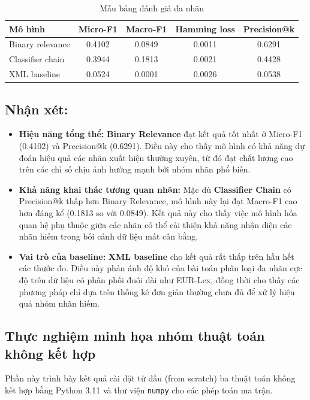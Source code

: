 \begin{table}[H]
\centering
\caption{Mẫu bảng đánh giá đa nhãn}
\begin{tabular}{lcccc}
\toprule
\textbf{Mô hình} & \textbf{Micro-F1} & \textbf{Macro-F1} & \textbf{Hamming loss} & \textbf{Precision@k} \\
\midrule
Binary relevance &  0.4102  & 0.0849  & 0.0011 & 0.6291 \\
Classifier chain & 0.3944 &  0.1813 & 0.0021 & 0.4428 \\
XML baseline & 0.0524 & 0.0001 & 0.0026 & 0.0538 \\
\bottomrule
\end{tabular}
\end{table}

\subsection*{Nhận xét:}
\begin{itemize}
    \item \textbf{Hiệu năng tổng thể:} \textbf{Binary Relevance} đạt kết quả tốt nhất ở Micro-F1 (0.4102) và Precision@k (0.6291). Điều này cho thấy mô hình có khả năng dự đoán hiệu quả các nhãn xuất hiện thường xuyên, từ đó đạt chất lượng cao trên các chỉ số chịu ảnh hưởng mạnh bởi nhóm nhãn phổ biến.
    \item \textbf{Khả năng khai thác tương quan nhãn:} Mặc dù \textbf{Classifier Chain} có Precision@k thấp hơn Binary Relevance, mô hình này lại đạt Macro-F1 cao hơn đáng kể (0.1813 so với 0.0849). Kết quả này cho thấy việc mô hình hóa quan hệ phụ thuộc giữa các nhãn có thể cải thiện khả năng nhận diện các nhãn hiếm trong bối cảnh dữ liệu mất cân bằng.
    \item \textbf{Vai trò của baseline:} \textbf{XML baseline} cho kết quả rất thấp trên hầu hết các thước đo. Điều này phản ánh độ khó của bài toán phân loại đa nhãn cực độ trên dữ liệu có phân phối đuôi dài như EUR-Lex, đồng thời cho thấy các phương pháp chỉ dựa trên thống kê đơn giản thường chưa đủ để xử lý hiệu quả nhóm nhãn hiếm.
\end{itemize}

\subsection{Thực nghiệm minh họa nhóm thuật toán không kết hợp}
\label{ssec:exp_uncombined}

Phần này trình bày kết quả cài đặt từ đầu (from scratch) ba thuật toán không kết hợp bằng Python 3.11 và thư viện \texttt{numpy} cho các phép toán ma trận.

